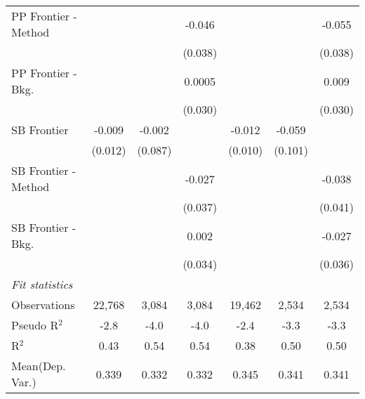 \begin{tabular}{lcccccc}
   PP Frontier - Method &               &         & -0.046  &               &         & -0.055\\   
                        &               &         & (0.038) &               &         & (0.038)\\   
   PP Frontier - Bkg.   &               &         & 0.0005  &               &         & 0.009\\   
                        &               &         & (0.030) &               &         & (0.030)\\   
   SB Frontier          & -0.009        & -0.002  &         & -0.012        & -0.059  &   \\   
                        & (0.012)       & (0.087) &         & (0.010)       & (0.101) &   \\   
   SB Frontier - Method &               &         & -0.027  &               &         & -0.038\\   
                        &               &         & (0.037) &               &         & (0.041)\\   
   SB Frontier - Bkg.   &               &         & 0.002   &               &         & -0.027\\   
                        &               &         & (0.034) &               &         & (0.036)\\   
   \midrule
   \emph{Fit statistics}\\
   Observations         & 22,768        & 3,084   & 3,084   & 19,462        & 2,534   & 2,534\\  
   Pseudo R$^2$         & -2.8          & -4.0    & -4.0    & -2.4          & -3.3    & -3.3\\  
   R$^2$                & 0.43          & 0.54    & 0.54    & 0.38          & 0.50    & 0.50\\  
Mean(Dep. Var.) & 0.339 & 0.332 & 0.332 & 0.345 & 0.341 & 0.341 \\
   

\end{tabular}
